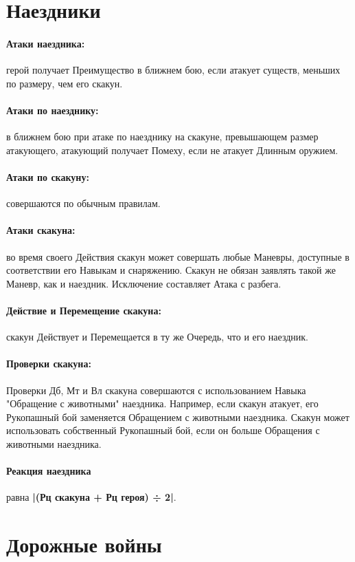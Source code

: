 \section{Наездники}
\paragraph{Атаки наездника:} герой получает Преимущество в ближнем бою, если атакует существ, меньших по размеру, чем его скакун.
\paragraph{Атаки по наезднику:} в ближнем бою при атаке по наезднику на скакуне, превышающем размер атакующего, атакующий получает Помеху, если не атакует Длинным оружием.
\paragraph{Атаки по скакуну:} совершаются по обычным правилам.
\paragraph{Атаки скакуна:} во время своего Действия скакун может совершать любые Маневры, доступные в соответствии его Навыкам и снаряжению. Скакун не обязан заявлять такой же Маневр, как и наездник. Исключение составляет Атака с разбега.
\paragraph{Действие и Перемещение скакуна:} скакун Действует и Перемещается в ту же Очередь, что и его наездник.
\paragraph{Проверки скакуна:} Проверки Дб, Мт и Вл скакуна совершаются с использованием Навыка "Обращение с животными" наездника.
\newline
Например, если скакун атакует, его Рукопашный бой заменяется Обращением с животными наездника. Скакун может использовать собственный Рукопашный бой, если он больше Обращения с животными наездника.
\paragraph{Реакция наездника} равна \textbf{|(Рц скакуна + Рц героя) ÷ 2|}.

\section{Дорожные войны}
